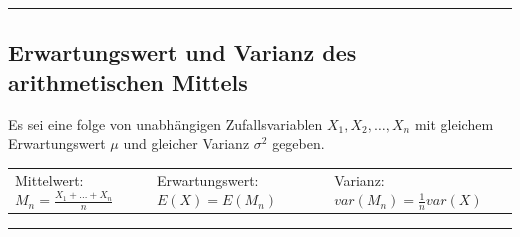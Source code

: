 \hrule

		\subsection{Erwartungswert und Varianz des arithmetischen Mittels }
		Es sei eine folge von unabhängigen Zufallsvariablen $X_1, X_2, \ldots , X_n$ mit gleichem
		Erwartungswert $ \mu $ und gleicher Varianz $ \sigma^2 $ gegeben.  \\
		\begin{tabular}{p{6cm} p{6cm} p{6cm}}
	        Mittelwert: $M_n=\frac{X_1+\ldots+X_n}{n}$ 
	        & Erwartungswert: $E(X)=E(M_n)$
	        & Varianz: $var(M_n)=\frac{1}{n}var(X)$
        \end{tabular}
\vspace{1mm}

\hrule

